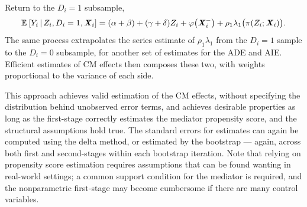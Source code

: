 Return to the $D_i = 1$ subsample,
\[ \mathbb{E}_{} \left[ Y_i \, \middle\vert \, Z_i, D_i = 1, \boldsymbol{\mathit{X}}_i \right] =
    (\alpha + \beta) + (\gamma + \delta) Z_i + \varphi\big( \boldsymbol{\mathit{X}}_i^- \big)
    +  \rho_1 \lambda_1 \big( \pi(Z_i ; \boldsymbol{\mathit{X}}_i) \big). \]
The same process extrapolates the series estimate of $\rho_1 \lambda_1$ from the $D_i =1$ sample to the $D_i = 0$ subsample, for another set of estimates for the ADE and AIE.
Efficient estimates of CM effects then composes these two, with weights proportional to the variance of each side.

This approach achieves valid estimation of the CM effects, without specifying the distribution behind unobserved error terms, and achieves desirable properties as long as the first-stage correctly estimates the mediator propensity score, and the structural assumptions hold true.
The standard errors for estimates can again be computed using the delta method, or estimated by the bootstrap --- again, across both first and second-stages within each bootstrap iteration.
Note that relying on propensity score estimation requires assumptions that can be found wanting in real-world settings; a common support condition for the mediator is required, and the nonparametric first-stage may become cumbersome if there are many control variables.


%
%

